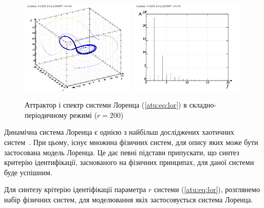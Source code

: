\begin{figure}[ht!]
\begin{center}
  \includegraphics[width=0.49\textwidth]{p/cha/lor/lor0-p_xyz_r=200.png}
  \hfill
  \includegraphics[width=0.49\textwidth]{p/cha/lor/lor0_fft-p_f_r=200.png}
\end{center}
\caption{Аттрактор і спектр системи Лоренца (\ref{atu:eq:lor}) в складно-періодичному режимі ($r = 200 $)}
\label{atu:f:lor_attractor_phase_200}
\end{figure}



Динамічна система Лоренца є однією з найбільш досліджених
хаотичних систем~\cite{neimark_stoch_chaos_vibro}. При цьому, існує множина
фізичних систем, для опису яких може бути застосована модель
Лоренца. Це дає певні підстави припускати, що синтез критерію
ідентифікації, заснованого на фізичних принципах, для даної
системи буде успішним.


Для синтезу крітерію ідентіфікації параметра
$ r $ системи (\ref{atu:eq:lor}), розглянемо набір фізичних систем, для
моделювання якіх застосовується система Лоренца.

